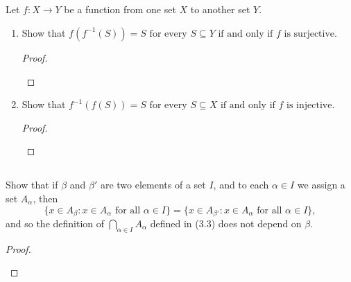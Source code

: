 \documentclass[../../main.tex]{subfiles}
\begin{document}
\addtocounter{subsection}{1}
\subsection{}
\begin{q}
    Let $f \colon X \to Y$ be a function from one set $X$ to another set $Y$. 
    
    \begin{enumerate}
        \item
        Show that $f(f^{-1}(S)) = S \text{ for every } S \subseteq Y \text{ if and only if } f \text{ is surjective.}$
        \begin{proof}
            
            \begin{xx}
                
            \end{xx}
        \end{proof}

        \item 
        Show that \(f^{-1}(f(S)) = S \text{ for every } S \subseteq X \text{ if and only if } f \text{ is injective.}\)
        \begin{proof}
            
            \begin{xx}
                
            \end{xx}
        \end{proof}
    \end{enumerate}

\end{q}

\addtocounter{subsection}{3}
\subsection{}
\begin{q}
    Show that if $\beta$ and $\beta'$ are two elements of a set $I$, and to each $\alpha \in I$ we assign a set $A_\alpha$, then \[
        \{
            x \in A_\beta : x \in A_\alpha \text{ for all } \alpha \in I
        \} = 
        \{
            x \in A_{\beta'} : x \in A_\alpha \text{ for all } \alpha \in I
        \},
    \]
    and so the definition of $\bigcap_{\alpha \in I} A_\alpha$ defined in (3.3) does not depend on $\beta$. 
\end{q}

\begin{proof}
    
    \begin{xx}
        
    \end{xx}
\end{proof}
\end{document}
